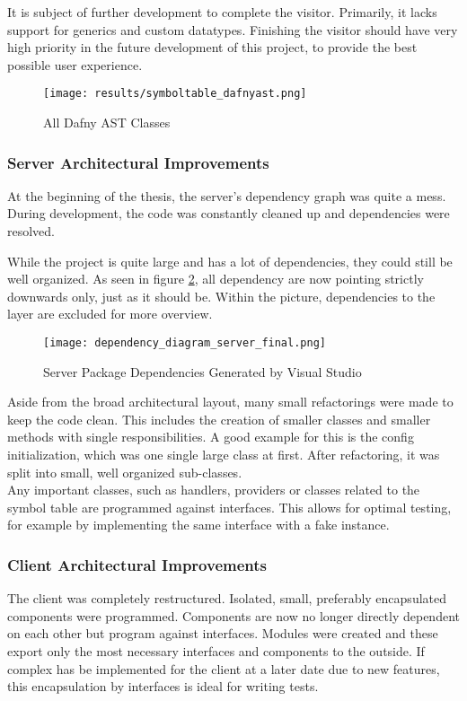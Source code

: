 It is subject of further development to complete the visitor.
Primarily, it lacks support for generics and custom datatypes.
Finishing the visitor should have very high priority in the future development of this project,
to provide the best possible user experience.

\begin{figure}[H]
    \centering
    \texttt{[image: results/symboltable\_dafnyast.png]}
    \caption{All Dafny AST Classes}
    \label{fig:dafnyASTOverview_3}
\end{figure}

\subsubsection{Server Architectural Improvements}
At the beginning of the thesis, the server's dependency graph was quite a mess.
During development, the code was constantly cleaned up and dependencies were resolved.

While the project is quite large and has a lot of dependencies, they could still be well organized.
As seen in figure \ref{fig:dependency_graph_2}, all dependency are now pointing strictly downwards only, just as it should be.
Within the picture, dependencies to the  layer are excluded for more overview.
\begin{figure}[H]
    \centering
    \texttt{[image: dependency\_diagram\_server\_final.png]}
    \caption{Server Package Dependencies Generated by Visual Studio}
    \label{fig:dependency_graph_2}
\end{figure}

Aside from the broad architectural layout, many small refactorings were made to keep the code clean.
This includes the creation of smaller classes and smaller methods with single responsibilities.
A good example for this is the config initialization, which was one single large class at first.
After refactoring, it was split into small, well organized sub-classes.\\

Any important classes, such as handlers, providers or classes related to the symbol table are programmed against interfaces.
This allows for optimal testing, for example by implementing the same interface with a fake instance.

\subsubsection{Client Architectural Improvements}
The client was completely restructured.
Isolated, small, preferably encapsulated components were programmed.
Components are now no longer directly dependent on each other but program against interfaces.
Modules were created and these export only the most necessary interfaces and components to the outside.
If complex has be implemented for the client at a later date due to new features,
this encapsulation by interfaces is ideal for writing tests. \\

